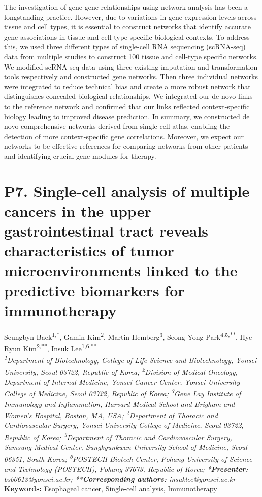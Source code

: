 \noindent
The investigation of gene-gene relationships using network analysis has been a longstanding practice. However, due to variations in gene expression levels across tissue and cell types, it is essential to construct networks that identify accurate gene associations in tissue and cell type-specific biological contexts. To address this, we used three different types of single-cell RNA sequencing (scRNA-seq) data from multiple studies to construct 100 tissue and cell-type specific networks. We modified scRNA-seq data using three existing imputation and transformation tools respectively and constructed gene networks. Then three individual networks were integrated to reduce technical bias and create a more robust network that distinguishes concealed biological relationships. We integrated our de novo links to the reference network and confirmed that our links reflected context-specific biology leading to improved disease prediction. In summary, we constructed de novo comprehensive networks derived from single-cell atlas, enabling the detection of more context-specific gene correlations. Moreover, we expect our networks to be effective references for comparing networks from other patients and identifying crucial gene modules for therapy.
\newpage

\section*{P7. Single-cell analysis of multiple cancers in the upper gastrointestinal tract reveals characteristics of tumor microenvironments linked to the predictive biomarkers for immunotherapy}

\begin{center}
Seungbyn Baek\textsuperscript{1,*}, Gamin Kim\textsuperscript{2}, Martin Hemberg\textsuperscript{3}, Seong Yong Park\textsuperscript{4,5,**}, Hye Ryun Kim\textsuperscript{2,**}, Insuk Lee\textsuperscript{1,6,**} \\
\vspace{0.3cm}
\textit{\textsuperscript{1}Department of Biotechnology, College of Life Science and Biotechnology, Yonsei University, Seoul 03722, Republic of Korea; \textsuperscript{2}Division of Medical Oncology, Department of Internal Medicine, Yonsei Cancer Center, Yonsei University College of Medicine, Seoul 03722, Republic of Korea; \textsuperscript{3}Gene Lay Institute of Immunology and Inflammation, Harvard Medical School and Brigham and Women’s Hospital, Boston, MA, USA; \textsuperscript{4}Department of Thoracic and Cardiovascular Surgery, Yonsei University College of Medicine, Seoul 03722, Republic of Korea; \textsuperscript{5}Department of Thoracic and Cardiovascular Surgery, Samsung Medical Center, Sungkyunkwan University School of Medicine, Seoul 06351, South Korea; \textsuperscript{6}POSTECH Biotech Center, Pohang University of Science and Technology (POSTECH), Pohang 37673, Republic of Korea; *\textbf{Presenter:} bsb0613@yonsei.ac.kr; **\textbf{Corresponding authors:} insuklee@yonsei.ac.kr} \\
\vspace{0.3cm}
\textbf{Keywords:} Esophageal cancer, Single-cell analysis, Immunotherapy
\end{center}

